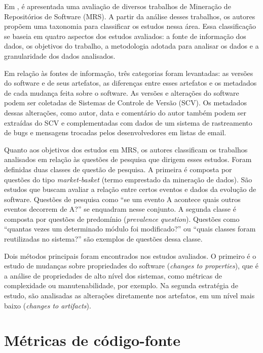 \documentclass[a4paper, 12pt, twoside]{book}
\begin{document}
        Em \cite{Kagdi:2007}, é apresentada uma avaliação de diversos trabalhos de Mineração
        de Repositórios de Software (MRS). A partir da análise desses trabalhos, os autores propõem
        uma taxonomia para classificar os estudos nessa área. Essa classificação se baseia
        em quatro aspectos dos estudos avaliados: a fonte de informação dos dados, os objetivos
        do trabalho, a metodologia adotada para analisar os dados e a granularidade dos dados
        analisados.

        Em relação às fontes de informação, três categorias foram levantadas: as versões do software 
        e de seus artefatos, as diferenças entre esses artefatos e os metadados de cada mudança
        feita sobre o software. As versões e alterações do software podem ser coletadas de Sistemas
        de Controle de Versão (SCV). Os metadados dessas alterações, como autor, data e comentário do 
        autor também podem ser extraídas do SCV e complementadas com dados de um sistema de 
        rastreamento de bugs e mensagens trocadas pelos desenvolvedores em listas de email.

        Quanto aos objetivos dos estudos em MRS, os autores classificam os trabalhos analisados
        em relação às questões de pesquisa que dirigem esses estudos. Foram definidas duas classes
        de questão de pesquisa. A primeira é composta por questões do tipo \textit{market-basket}
        (termo emprestado da mineração de dados). São estudos que buscam avaliar a relação
        entre certos eventos e dados da evolução de software. Questões de pesquisa como ``se um evento A
        acontece quais outros eventos decorrem de A?'' se enquadram nesse conjunto. A segunda classe
        é composta por questões de predomínio (\textit{prevalence question}). Questões como ``quantas
        vezes um determinado módulo foi modificado?'' ou ``quais classes foram reutilizadas no sistema?''
        são exemplos de questões dessa classe.

        Dois métodos principais foram encontrados nos estudos avaliados. O primeiro é o estudo
        de mudanças sobre propriedades do software (\textit{changes to properties}), que é a 
        análise de propriedades de alto nível dos sistemas, como métricas de complexidade ou
        manutenabilidade, por exemplo. Na segunda estratégia de estudo, são analisadas 
        as alterações diretamente nos artefatos, em um nível mais baixo 
        (\textit{changes to artifacts}).

    \section{Métricas de código-fonte} \label{sc:metricas}
\end{document}
